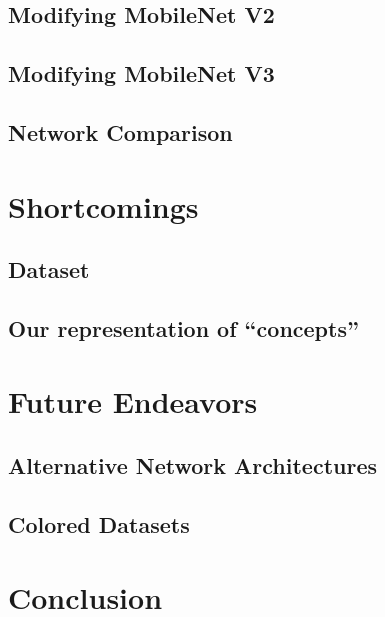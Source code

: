 \documentclass[conference]{IEEEtran}
\begin{document}
\subsection{Modifying MobileNet V2}


\subsection{Modifying MobileNet V3}


\subsection{Network Comparison}




\section{Shortcomings} %


\subsection{Dataset}


\subsection{Our representation of ``concepts''}




\section{Future Endeavors} %


\subsection{Alternative Network Architectures}


\subsection{Colored Datasets}





\section{Conclusion} %







\appendix
\end{document}
